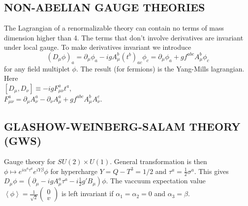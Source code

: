 \documentclass[a4paper, norsk, 8pt, landscape]{article}
\newcommand{\expe}[1] { \left\langle#1\right\rangle }
\begin{document}
\begin{multicols*}{3}
\subsection*{\small  NON-ABELIAN GAUGE THEORIES}
The Lagrangian of a renormalizable theory can contain no terms of mass dimension higher than 4.
The terms that don't involve derivatives are invariant under local gauge. To make derivatives invariant
we introduce
\[(D_\mu \phi)_a
= \partial_\mu \phi_a - ig A_\mu^b (t^b)_{ac} \phi_c
= \partial_\mu\phi_a + gf^{abc}A_\mu^b \phi_c\]
for any field multiplet $\phi$. The result (for fermions) is the Yang-Mills lagrangian. Here \\
$[D_\mu,D_\nu] \equiv -ig F_{\mu\nu}^a t^a$, \\
$F_{\mu\nu}^a = \partial_\mu A_\nu^a - \partial_\nu A_\mu^a + g f^{abc}A_\mu^b A_\nu^c$. \\










\subsection*{\small  GLASHOW-WEINBERG-SALAM THEORY (GWS)}
Gauge theory for $SU(2)\times U(1)$. General transformation is then
$\phi \mapsto e^{i\alpha^a \tau^a}e^{iY\beta}\phi$ for hypercharge $Y=Q-T^3=1/2$ and $\tau^a=\frac{1}{2}\sigma^a$.
This gives
$D_\mu \phi = (\partial_\mu -igA_\mu^a\tau^a - i \frac{1}{2}g'B_\mu)\phi$.
The vaccuum expectation value
$\expe{\phi}=\frac{1}{\sqrt{2}}
\left(\begin{matrix}
0 \\ v
\end{matrix}\right)$
is left invariant if $\alpha_1 = \alpha_2 = 0$ and $\alpha_3 = \beta$.


\end{multicols*}
\end{document}
